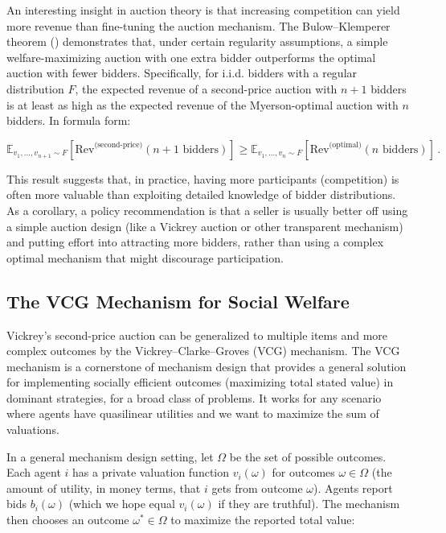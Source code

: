 \documentclass[
  letterpaper,
  numbers=noenddot,
  DIV=11]{scrreprt}
\theoremstyle{definition}
\theoremstyle{plain}
\theoremstyle{plain}
\theoremstyle{remark}
\begin{document}
An interesting insight in auction theory is that increasing competition
can yield more revenue than fine-tuning the auction mechanism. The
Bulow--Klemperer theorem () demonstrates that, under certain regularity
assumptions, a simple welfare-maximizing auction with one extra bidder
outperforms the optimal auction with fewer bidders. Specifically, for
i.i.d. bidders with a regular distribution \(F\), the expected revenue
of a second-price auction with \(n+1\) bidders is at least as high as
the expected revenue of the Myerson-optimal auction with \(n\) bidders.
In formula form:

\[
\mathbb{E}_{v_1,\ldots,v_{n+1} \sim F}[\text{Rev}^{\text{(second-price)}}(n+1 \text{ bidders})] \geq 
\mathbb{E}_{v_1,\ldots,v_n \sim F}[\text{Rev}^{\text{(optimal)}}(n \text{ bidders})] \,. 
\tag{4.1}\label{eq-eq3.64}
\]

This result suggests that, in practice, having more participants
(competition) is often more valuable than exploiting detailed knowledge
of bidder distributions. As a corollary, a policy recommendation is that
a seller is usually better off using a simple auction design (like a
Vickrey auction or other transparent mechanism) and putting effort into
attracting more bidders, rather than using a complex optimal mechanism
that might discourage participation.

\subsection{The VCG Mechanism for Social
Welfare}\label{the-vcg-mechanism-for-social-welfare}

Vickrey's second-price auction can be generalized to multiple items and
more complex outcomes by the Vickrey--Clarke--Groves (VCG) mechanism.
The VCG mechanism is a cornerstone of mechanism design that provides a
general solution for implementing socially efficient outcomes
(maximizing total stated value) in dominant strategies, for a broad
class of problems. It works for any scenario where agents have
quasilinear utilities and we want to maximize the sum of valuations.

In a general mechanism design setting, let \(\Omega\) be the set of
possible outcomes. Each agent \(i\) has a private valuation function
\(v_i(\omega)\) for outcomes \(\omega \in \Omega\) (the amount of
utility, in money terms, that \(i\) gets from outcome \(\omega\)).
Agents report bids \(b_i(\omega)\) (which we hope equal \(v_i(\omega)\)
if they are truthful). The mechanism then chooses an outcome
\(\omega^* \in \Omega\) to maximize the reported total value:
\end{document}
